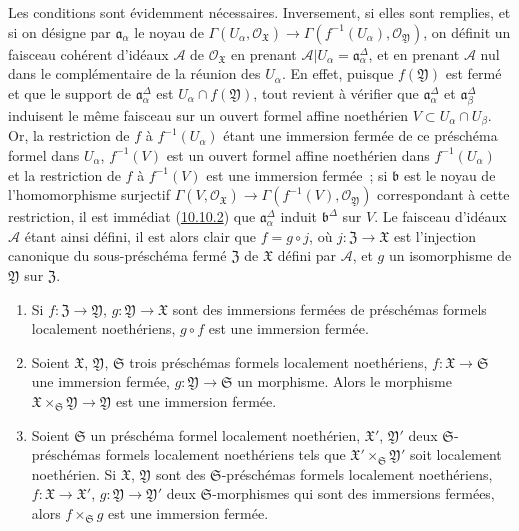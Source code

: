 Les conditions sont évidemment nécessaires. Inversement, si elles sont
remplies, et si on désigne par $\mathfrak{a}_\alpha$ le noyau de
$\Gamma(U_\alpha,\mathscr{O}_{\mathfrak{X}})\to
\Gamma(f^{-1}(U_\alpha),\mathscr{O}_{\mathfrak{Y}})$, on définit un faisceau
cohérent d'idéaux $\mathscr{A}$ de $\mathscr{O}_{\mathfrak{X}}$ en prenant
$\mathscr{A}|U_\alpha=\mathfrak{a}_\alpha^\Delta$, et en prenant $\mathscr{A}$
nul dans le complémentaire de la réunion des $U_\alpha$. En effet, puisque
$f(\mathfrak{Y})$ est fermé et que le support de
$\mathfrak{a}_\alpha^\Delta$ est $U_\alpha\cap f(\mathfrak{Y})$, tout revient
à vérifier que $\mathfrak{a}_\alpha^\Delta$ et
$\mathfrak{a}_\beta^\Delta$ induisent le même faisceau sur un ouvert formel
affine noethérien $V\subset U_\alpha\cap U_\beta$. Or, la restriction de $f$
à $f^{-1}(U_\alpha)$ étant une immersion fermée de ce préschéma formel dans
$U_\alpha$, $f^{-1}(V)$ est un ouvert formel affine noethérien dans
$f^{-1}(U_\alpha)$ et la restriction de $f$ à $f^{-1}(V)$ est une immersion
fermée~; si $\mathfrak{b}$ est le noyau de l'homomorphisme surjectif
$\Gamma(V,\mathscr{O}_{\mathfrak{X}})\to
\Gamma(f^{-1}(V),\mathscr{O}_{\mathfrak{Y}})$ correspondant à cette
restriction, il est immédiat (\hyperref[I.10.10.2-fr]{10.10.2}) que
$\mathfrak{a}_\alpha^\Delta$ induit $\mathfrak{b}^\Delta$ sur $V$. Le faisceau
d'idéaux $\mathscr{A}$ étant ainsi défini, il est alors clair que
$f=g\circ j$, où $j:\mathfrak{Z}\to\mathfrak{X}$ est l'injection canonique du
sous-préschéma fermé $\mathfrak{Z}$ de $\mathfrak{X}$ défini par
$\mathscr{A}$, et $g$ un isomorphisme de $\mathfrak{Y}$ sur $\mathfrak{Z}$.

\begin{proposition}[10.14.5]
\label{I.10.14.5-fr}
\begin{enumerate}
  \item[\rm{(i)}] Si $f:\mathfrak{Z}\to\mathfrak{Y}$,
  $g:\mathfrak{Y}\to\mathfrak{X}$ sont des immersions fermées de préschémas
  formels localement noethériens, $g\circ f$ est une immersion fermée.

  \item[\rm{(ii)}] Soient $\mathfrak{X}$, $\mathfrak{Y}$, $\mathfrak{S}$ trois
  préschémas formels localement noethériens,
  $f:\mathfrak{X}\to\mathfrak{S}$ une immersion fermée,
  $g:\mathfrak{Y}\to\mathfrak{S}$ un morphisme. Alors le morphisme
  $\mathfrak{X}\times_{\mathfrak{S}}\mathfrak{Y}\to\mathfrak{Y}$ est une
  immersion fermée.
  \item[\rm{(iii)}] Soient $\mathfrak{S}$ un préschéma formel localement
  noethérien, $\mathfrak{X}'$, $\mathfrak{Y}'$ deux
  $\mathfrak{S}$-préschémas formels localement noethériens tels que
  $\mathfrak{X}'\times_{\mathfrak{S}}\mathfrak{Y}'$ soit localement
  noethérien. Si $\mathfrak{X}$, $\mathfrak{Y}$ sont des
  $\mathfrak{S}$-préschémas formels localement noethériens,
  $f:\mathfrak{X}\to\mathfrak{X}'$, $g:\mathfrak{Y}\to\mathfrak{Y}'$ deux
  $\mathfrak{S}$-morphismes qui sont des immersions fermées, alors
  $f\times_{\mathfrak{S}}g$ est une immersion fermée.
\end{enumerate}
\end{proposition}


